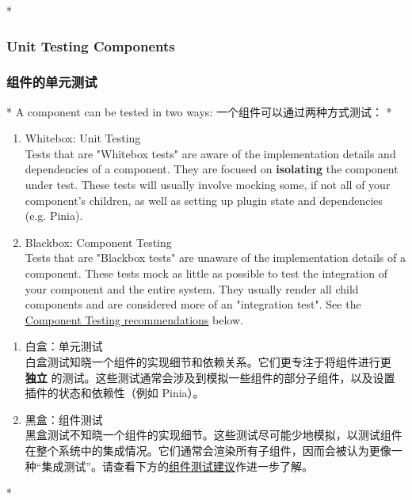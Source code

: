 \begin{paracol}{2}
\switchcolumn[0]*%
\subsubsection{Unit Testing Components}
\switchcolumn
\subsubsection{组件的单元测试}
\switchcolumn[0]*%
A component can be tested in two ways:
\switchcolumn
一个组件可以通过两种方式测试：
\switchcolumn[0]*%
\begin{enumerate}
\def\labelenumi{\arabic{enumi}.}
\item
  Whitebox: Unit Testing\\
  Tests that are "Whitebox tests" are aware of the implementation
  details and dependencies of a component. They are focused on
  \textbf{isolating} the component under test. These tests will usually
  involve mocking some, if not all of your component's children, as well
  as setting up plugin state and dependencies (e.g. Pinia).
\item
  Blackbox: Component Testing\\
  Tests that are "Blackbox tests" are unaware of the implementation
  details of a component. These tests mock as little as possible to test
  the integration of your component and the entire system. They usually
  render all child components and are considered more of an "integration
  test". See the
  \href{https://vuejs.org/guide/scaling-up/testing.html\#component-testing}{Component
  Testing recommendations} below.
\end{enumerate}
\switchcolumn
\begin{enumerate}
\def\labelenumi{\arabic{enumi}.}
\item
  白盒：单元测试\\
  白盒测试知晓一个组件的实现细节和依赖关系。它们更专注于将组件进行更
  \textbf{独立}
  的测试。这些测试通常会涉及到模拟一些组件的部分子组件，以及设置插件的状态和依赖性（例如
  Pinia）。
\item
  黑盒：组件测试\\
  黑盒测试不知晓一个组件的实现细节。这些测试尽可能少地模拟，以测试组件在整个系统中的集成情况。它们通常会渲染所有子组件，因而会被认为更像一种``集成测试''。请查看下方的\href{https://cn.vuejs.org/guide/scaling-up/testing.html\#component-testing}{组件测试建议}作进一步了解。
\end{enumerate}
\switchcolumn[0]*%

\end{paracol}
